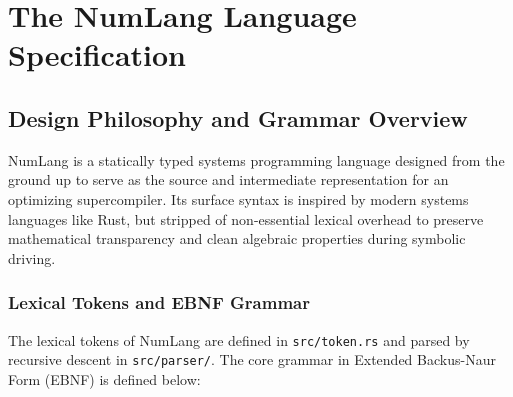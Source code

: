 \chapter{The NumLang Language Specification}
\label{chap:language}

\section{Design Philosophy and Grammar Overview}
\label{sec:lang:philosophy}

NumLang is a statically typed systems programming language designed from the ground up to serve as the source and intermediate representation for an optimizing supercompiler. Its surface syntax is inspired by modern systems languages like Rust, but stripped of non-essential lexical overhead to preserve mathematical transparency and clean algebraic properties during symbolic driving.

\subsection{Lexical Tokens and EBNF Grammar}
The lexical tokens of NumLang are defined in \texttt{src/token.rs} and parsed by recursive descent in \texttt{src/parser/}. The core grammar in Extended Backus-Naur Form (EBNF) is defined below:

